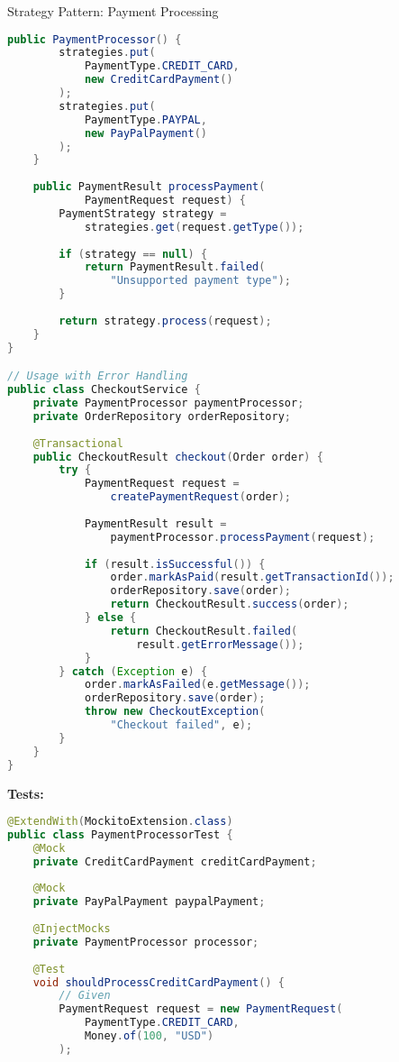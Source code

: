 \begin{example2}{Strategy Pattern: Payment Processing}
\begin{lstlisting}[language=Java, style=basesmol]
    public PaymentProcessor() {
        strategies.put(
            PaymentType.CREDIT_CARD, 
            new CreditCardPayment()
        );
        strategies.put(
            PaymentType.PAYPAL, 
            new PayPalPayment()
        );
    }
    
    public PaymentResult processPayment(
            PaymentRequest request) {
        PaymentStrategy strategy = 
            strategies.get(request.getType());
            
        if (strategy == null) {
            return PaymentResult.failed(
                "Unsupported payment type");
        }
        
        return strategy.process(request);
    }
}

// Usage with Error Handling
public class CheckoutService {
    private PaymentProcessor paymentProcessor;
    private OrderRepository orderRepository;
    
    @Transactional
    public CheckoutResult checkout(Order order) {
        try {
            PaymentRequest request = 
                createPaymentRequest(order);
                
            PaymentResult result = 
                paymentProcessor.processPayment(request);
                
            if (result.isSuccessful()) {
                order.markAsPaid(result.getTransactionId());
                orderRepository.save(order);
                return CheckoutResult.success(order);
            } else {
                return CheckoutResult.failed(
                    result.getErrorMessage());
            }
        } catch (Exception e) {
            order.markAsFailed(e.getMessage());
            orderRepository.save(order);
            throw new CheckoutException(
                "Checkout failed", e);
        }
    }
}
\end{lstlisting}

\textbf{Tests:}
\begin{lstlisting}[language=Java, style=basesmol]
@ExtendWith(MockitoExtension.class)
public class PaymentProcessorTest {
    @Mock
    private CreditCardPayment creditCardPayment;
    
    @Mock
    private PayPalPayment paypalPayment;
    
    @InjectMocks
    private PaymentProcessor processor;
    
    @Test
    void shouldProcessCreditCardPayment() {
        // Given
        PaymentRequest request = new PaymentRequest(
            PaymentType.CREDIT_CARD,
            Money.of(100, "USD")
        );
        

\end{lstlisting}
\end{example2}
